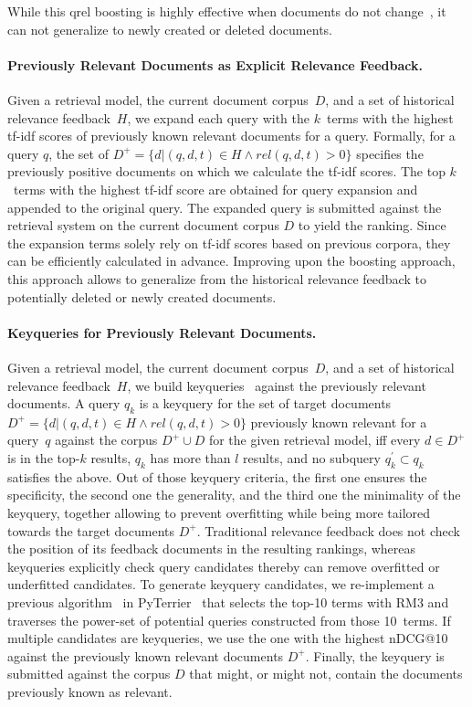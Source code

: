 While this qrel boosting is highly effective when documents do not change~\cite{alkhalifa:2024,keller:2024b}, it can not generalize to newly created or deleted documents.


\paragraph{Previously Relevant Documents as Explicit Relevance Feedback.} Given a retrieval model, the current document corpus~$D$, and a set of historical relevance feedback~$H$, we expand each query with the $k$~terms with the highest tf-idf scores of previously known relevant documents for a query. Formally, for a query $q$, the set of $D^{+} = \{d| (q,d,t) \in H \wedge rel(q,d,t) > 0\}$ specifies the previously positive documents on which we calculate the tf-idf scores. The top $k$~terms with the highest tf-idf score are obtained for query expansion and appended to the original query. The expanded query is submitted against the retrieval system on the current document corpus $D$ to yield the ranking. Since the expansion terms solely rely on tf-idf scores based on  previous corpora, they can be efficiently calculated in advance. Improving upon the boosting approach, this approach allows to generalize from the historical relevance feedback to potentially deleted or newly created documents. 


\paragraph{Keyqueries for Previously Relevant Documents.} Given a retrieval model, the current document corpus~$D$, and a set of historical relevance feedback~$H$, we build keyqueries~\cite{froebe:2021c,gollub:2013a,hagen:2016b} against the previously relevant documents. A query $q_{k}$ is a keyquery for the set of target documents $D^{+} = \{d| (q,d,t) \in H \wedge rel(q,d,t) > 0\}$ previously known relevant for a query~$q$ against the corpus $D^{+} \cup D$ for the given retrieval model, iff \Ni every $d \in D^{+}$ is in the top-$k$ results, \Nii $q_{k}$ has more than $l$ results, and \Niii no subquery $q^{'}_{k} \subset q_{k}$ satisfies the above. Out of those keyquery criteria, the first one ensures the specificity, the second one the generality, and the third one the minimality of the keyquery, together allowing to prevent overfitting while being more tailored towards the target documents $D^{+}$. Traditional relevance feedback does not check the position of its feedback documents in the resulting rankings, whereas keyqueries explicitly check query candidates thereby can remove overfitted or underfitted candidates. To generate keyquery candidates, we re-implement a previous algorithm~\cite{froebe:2022d} in PyTerrier~\cite{macdonald:2020} that selects the top-10 terms with RM3 and traverses the power-set of potential queries constructed from those 10~terms. If multiple candidates are keyqueries, we use the one with the highest nDCG@10 against the previously known relevant documents $D^{+}$. Finally, the keyquery is submitted against the corpus $D$ that might, or might not, contain the documents previously known as relevant.

